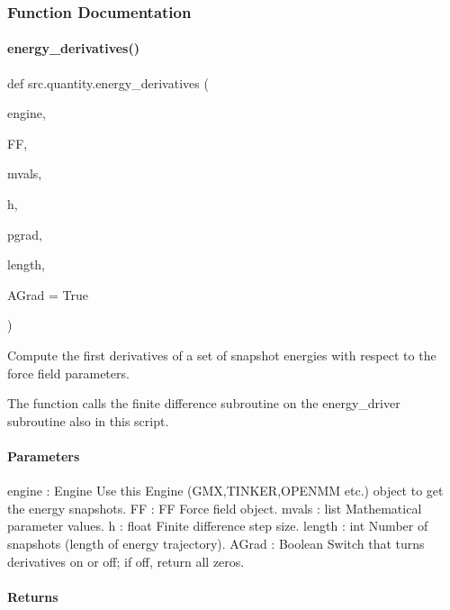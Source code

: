 \subsubsection{Function Documentation}
\mbox{\label{namespacesrc_1_1quantity_ad54b891da90cd132afe1a57dfde0f03f}} 
\paragraph{\texorpdfstring{energy\+\_\+derivatives()}{energy\_derivatives()}}
{\footnotesize\ttfamily def src.\+quantity.\+energy\+\_\+derivatives (\begin{DoxyParamCaption}\item[{}]{engine,  }\item[{}]{FF,  }\item[{}]{mvals,  }\item[{}]{h,  }\item[{}]{pgrad,  }\item[{}]{length,  }\item[{}]{A\+Grad = {\ttfamily True} }\end{DoxyParamCaption})}



Compute the first derivatives of a set of snapshot energies with respect to the force field parameters. 

The function calls the finite difference subroutine on the energy\+\_\+driver subroutine also in this script.

\paragraph*{Parameters }

engine \+: Engine Use this Engine ({\ttfamily G\+MX},{\ttfamily T\+I\+N\+K\+ER},{\ttfamily O\+P\+E\+N\+MM} etc.) object to get the energy snapshots. FF \+: FF Force field object. mvals \+: list Mathematical parameter values. h \+: float Finite difference step size. length \+: int Number of snapshots (length of energy trajectory). A\+Grad \+: Boolean Switch that turns derivatives on or off; if off, return all zeros.

\paragraph*{Returns }

